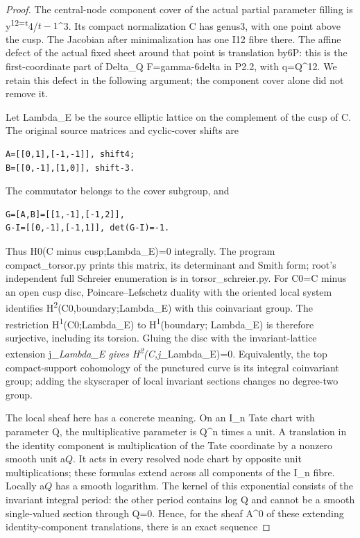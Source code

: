 \begin{proof}
The central-node component cover of the actual partial parameter filling is y\textsuperscript{12=t}4/\(t-1\)\^{}3. Its compact normalization C has genus3, with one point above the cusp. The Jacobian after minimalization has one I12 fibre there. The affine defect of the actual fixed sheet around that point is translation by6P: this is the first-coordinate part of Delta\_Q F=gamma-6delta in P2.2, with q=Q\^{}12. We retain this defect in the following argument; the component cover alone did not remove it.

Let Lambda\_E be the source elliptic lattice on the complement of the cusp of C. The original source matrices and cyclic-cover shifts are

\begin{lstlisting}
A=[[0,1],[-1,-1]], shift4;
B=[[0,-1],[1,0]], shift-3.
\end{lstlisting}

The commutator belongs to the cover subgroup, and

\begin{lstlisting}
G=[A,B]=[[1,-1],[-1,2]],
G-I=[[0,-1],[-1,1]], det(G-I)=-1.
\end{lstlisting}

Thus H0(C minus cusp;Lambda\_E)=0 integrally. The program compact\_torsor.py prints this matrix, its determinant and Smith form; root's independent full Schreier enumeration is in torsor\_schreier.py. For C0=C minus an open cusp disc, Poincare--Lefschetz duality with the oriented local system identifies H\textsuperscript{2}(C0,boundary;Lambda\_E) with this coinvariant group. The restriction H\textsuperscript{1}(C0;Lambda\_E) to H\textsuperscript{1}(boundary; Lambda\_E) is therefore surjective, including its torsion. Gluing the disc with the invariant-lattice extension j\_\emph{Lambda\_E gives H\textsuperscript{2}(C,j\_}Lambda\_E)=0. Equivalently, the top compact-support cohomology of the punctured curve is its integral coinvariant group; adding the skyscraper of local invariant sections changes no degree-two group.

The local sheaf here has a concrete meaning. On an I\_n Tate chart with parameter Q, the multiplicative parameter is Q\^{}n times a unit. A translation in the identity component is multiplication of the Tate coordinate by a nonzero smooth unit a\(Q\). It acts in every resolved node chart by opposite unit multiplications; these formulas extend across all components of the I\_n fibre. Locally a\(Q\) has a smooth logarithm. The kernel of this exponential consists of the invariant integral period: the other period contains log Q and cannot be a smooth single-valued section through Q=0. Hence, for the sheaf A\^{}0 of these extending identity-component translations, there is an exact sequence


\end{proof}
